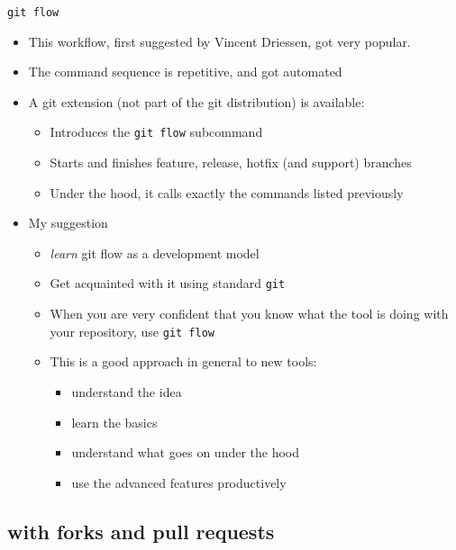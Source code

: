 \documentclass[presentation]{beamer}
\begin{document}
\begin{frame}[fragile]{\texttt{git flow}}
	\begin{itemize}
		\item This workflow, first suggested by Vincent Driessen, got very popular.
		\item The command sequence is repetitive, and got automated
		\item A git extension (not part of the git distribution) is available:
		\begin{itemize}
			\item Introduces the \texttt{git flow} subcommand
			\item Starts and finishes feature, release, hotfix (and support)  branches
			\item Under the hood, it calls exactly the commands listed previously
		\end{itemize}
		\item My suggestion 
		\begin{itemize}
			\item \textit{learn} git flow as a development model
			\item Get acquainted with it using standard \texttt{git}
			\item When you are very confident that you know what the tool is doing with your repository, use \texttt{git flow}
			\item This is a good approach in general to new tools:
			\begin{itemize}
				\item understand the idea
				\item learn the basics
				\item understand what goes on under the hood
				\item use the advanced features productively
			\end{itemize}
		\end{itemize}
	\end{itemize}
\end{frame}

\subsection{with forks and pull requests}
\end{document}
